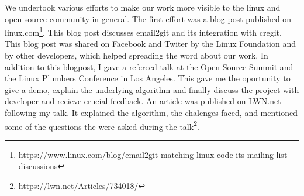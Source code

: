 We undertook various efforts to make our work more visible to the linux and open source community in general. The first effort was a blog post published on linux.com\footnote{\url{https://www.linux.com/blog/email2git-matching-linux-code-its-mailing-list-discussions}}. This blog post discusses email2git and its integration with cregit. This blog post was shared on Facebook and Twiter by the Linux Foundation and by other developers, which helped spreading the word about our work. In addition to this blogpost, I gave a refereed talk at the Open Source Summit and the Linux Plumbers Conference in Los Angeles. This gave me the oportunity to give a demo, explain the underlying algorithm and finally discuss the project with developer and recieve crucial feedback. An article was published on LWN.net following my talk. It explained the algorithm, the chalenges faced, and mentioned some of the questions the were asked during the talk\footnote{\url{https://lwn.net/Articles/734018/}}.







